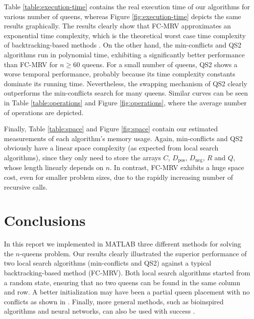 Table \ref{table:execution-time} contains the real execution time of our algorithms for various number of queens, whereas Figure \ref{fig:execution-time} depicts the same results graphically. The results clearly show that FC-MRV approximates an exponential time complexity, which is the theoretical worst case time complexity of backtracking-based methods \citep{aima}. On the other hand, the min-conflicts and QS2 algorithms run in polynomial time, exhibiting a significantly better performance than FC-MRV for $n \ge 60$ queens. For a small number of queens, QS2 shows a worse temporal performance, probably because its time complexity constants dominate its running time. Nevertheless, the swapping mechanism of QS2 clearly outperforms the min-conflicts search for many queens.  Similar curves can be seen in Table \ref{table:operations} and Figure \ref{fig:operations}, where the average number of operations are depicted.

Finally, Table \ref{table:space} and Figure \ref{fig:space} contain our estimated measurements of each algorithm's memory usage. Again, min-conflicts and QS2 obviously have a linear space complexity (as expected from local search algorithms), since they only need to store the arrays $C$, $D_{\text{pos}}$, $D_{\text{neg}}$, $R$ and $Q$, whose length linearly depends  on $n$. In contrast, FC-MRV exhibits a huge space cost, even for smaller problem sizes, due to the rapidly increasing number of recursive calls.













\section{Conclusions}

In this report we implemented in MATLAB three different methods for solving the $n$-queens problem. Our results clearly illustrated the superior performance of two local search algorithms (min-conflicts and QS2) against a typical backtracking-based method (FC-MRV). Both local search algorithms started from a random state, ensuring that no two queens can be found in the same column and row. A better initialization may have been a partial queen placement with no conflicts as shown in \citet{sosic91}. Finally, more general methods, such as bioinspired algorithms and neural networks, can also be used with success \citep{review}.












